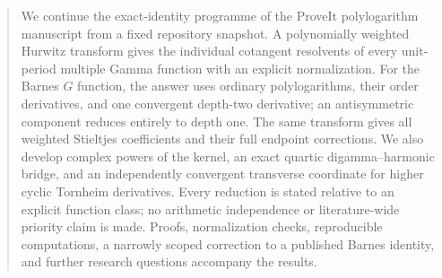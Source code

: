 

\maketitle
\begin{abstract}
We continue the exact-identity programme of the ProveIt polylogarithm
manuscript from a fixed repository snapshot. A polynomially weighted
Hurwitz transform gives the individual cotangent resolvents of every
unit-period multiple Gamma function with an explicit normalization.
For the Barnes $G$ function, the answer uses ordinary polylogarithms,
their order derivatives, and one convergent depth-two derivative; an
antisymmetric component reduces entirely to depth one. The same
transform gives all weighted Stieltjes coefficients and their full
endpoint corrections. We also develop complex powers of the kernel,
an exact quartic digamma--harmonic bridge, and an independently
convergent transverse coordinate for higher cyclic Tornheim
derivatives. Every reduction is stated relative to an explicit
function class; no arithmetic independence or literature-wide
priority claim is made. Proofs, normalization checks, reproducible
computations, a narrowly scoped correction to a published Barnes
identity, and further research questions accompany the results.
\end{abstract}
\tableofcontents
\newpage









